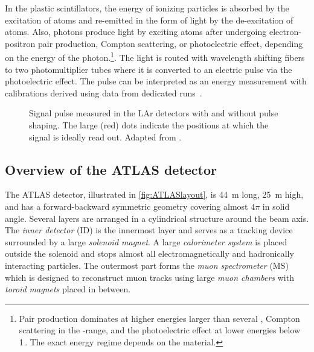 In the plastic scintillators, the energy of ionizing particles is absorbed by the excitation of atoms and re-emitted in the form of light by the de-excitation of atoms. Also, photons produce light by exciting atoms after undergoing electron-positron pair production, Compton scattering, or photoelectric effect, depending on the energy of the photon.\footnote{Pair production dominates at higher energies larger than several \MeV, Compton scattering in the \MeV-range, and the photoelectric effect at lower energies below 1\,\MeV. The exact energy regime depends on the material.}.
The light is routed with wavelength shifting fibers to two photomultiplier tubes where it is converted to an electric pulse via the photoelectric effect. The pulse can be interpreted as an energy measurement with calibrations derived using data from dedicated runs~\cite{PERF-2007-01}.

\begin{figure}[t]
    \caption[Signal pulse measured in the ATLAS LAr detectors.]{Signal pulse measured in the LAr detectors with and without pulse shaping. The large (red) dots indicate the positions at which the signal is ideally read out. Adapted from .}
    \label{fig:LAr-signal-pulse}
\end{figure}

\subsection{Overview of the ATLAS detector}
The ATLAS detector, illustrated in \cref{fig:ATLASlayout}, is \SI{44}{\meter} long, \SI{25}{\meter} high, and has a forward-backward symmetric geometry covering almost $4\pi$ in solid angle.
Several layers are arranged in a cylindrical structure around the beam axis.
The \emph{inner detector} (ID) is the innermost layer and serves as a tracking device surrounded by a large \emph{solenoid magnet}.
A large \emph{calorimeter system} is placed outside the solenoid and stops almost all electromagnetically and hadronically interacting particles.
The outermost part forms the \emph{muon spectrometer} (MS) which is designed to reconstruct muon tracks using large \emph{muon chambers} with \emph{toroid magnets} placed in between.

